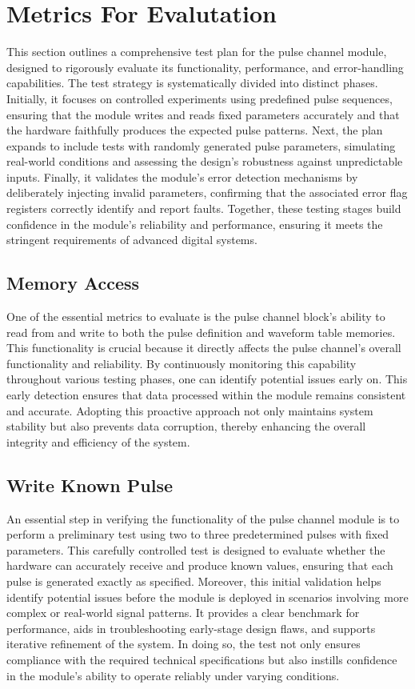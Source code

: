\chapter{Metrics For Evalutation}

This section outlines a comprehensive test plan for the pulse channel module, designed to rigorously evaluate its functionality, performance, and error-handling capabilities. The test strategy is systematically divided into distinct phases. Initially, it focuses on controlled experiments using predefined pulse sequences, ensuring that the module writes and reads fixed parameters accurately and that the hardware faithfully produces the expected pulse patterns. Next, the plan expands to include tests with randomly generated pulse parameters, simulating real-world conditions and assessing the design's robustness against unpredictable inputs. Finally, it validates the module's error detection mechanisms by deliberately injecting invalid parameters, confirming that the associated error flag registers correctly identify and report faults. Together, these testing stages build confidence in the module's reliability and performance, ensuring it meets the stringent requirements of advanced digital systems.

\section{Memory Access}

One of the essential metrics to evaluate is the pulse channel block's ability to read from and write to both the pulse definition and waveform table memories. This functionality is crucial because it directly affects the pulse channel's overall functionality and reliability. By continuously monitoring this capability throughout various testing phases, one can identify potential issues early on. This early detection ensures that data processed within the module remains consistent and accurate. Adopting this proactive approach not only maintains system stability but also prevents data corruption, thereby enhancing the overall integrity and efficiency of the system.

\section{Write Known Pulse}

An essential step in verifying the functionality of the pulse channel module is to perform a preliminary test using two to three predetermined pulses with fixed parameters. This carefully controlled test is designed to evaluate whether the hardware can accurately receive and produce known values, ensuring that each pulse is generated exactly as specified. Moreover, this initial validation helps identify potential issues before the module is deployed in scenarios involving more complex or real-world signal patterns. It provides a clear benchmark for performance, aids in troubleshooting early-stage design flaws, and supports iterative refinement of the system. In doing so, the test not only ensures compliance with the required technical specifications but also instills confidence in the module's ability to operate reliably under varying conditions.

